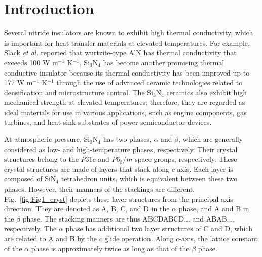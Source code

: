 \documentclass[twocolumn,amsmath,amssymb,a4paper,prb,superscriptaddress,floatfix]{revtex4-1}
\begin{document}
\section{Introduction}
Several nitride insulators are known to exhibit high thermal
conductivity, which is important for heat transfer materials at elevated
temperatures. For example, Slack {\it et al.}\cite{slack} reported that
wurtzite-type AlN has thermal conductivity that exceeds 100 W m$^{-1}$
K$^{-1}$. Si$_3$N$_4$ has become another promising thermal conductive
insulator because its thermal conductivity has been improved up to 177 W
m$^{-1}$ K$^{-1}$ through the use of advanced ceramic technologies
related to densification and microstructure
control.\cite{zhou,hirao-rev,watari,hirosaki} The Si$_3$N$_4$ ceramics
also exhibit high mechanical strength at elevated temperatures;
therefore, they are regarded as ideal materials for use in various
applications, such as engine components, gas turbines, and heat sink
substrates of power semiconductor devices.

At atmospheric pressure, Si$_3$N$_4$ has two phases, $\alpha$ and
$\beta$, which are generally considered as low- and high-temperature
phases, respectively.\cite{zhou,hirosaki-md,riley} Their crystal
structures belong to the $P31c$ and $P6_3/m$ space groups,
respectively.\cite{yashima,boulay} These crystal structures are made of
layers that stack along $c$-axis. Each layer is composed of SiN$_4$
tetrahedron units, which is equivalent between these two
phases. However, their manners of the stackings are
different.\cite{hampshire} Fig.~\ref{fig:Fig1_cryst} depicts these layer
structures from the principal axis direction. They are denoted as A, B,
C, and D in the $\alpha$ phase, and A and B in the $\beta$ phase. The
stacking manners are thus ABCDABCD... and ABAB..., respectively. The
$\alpha$ phase has additional two layer structures of C and D, which are
related to A and B by the $c$ glide operation.\cite{hampshire} Along
$c$-axis, the lattice constant of the $\alpha$ phase is approximately
twice as long as that of the $\beta$ phase.
\end{document}
